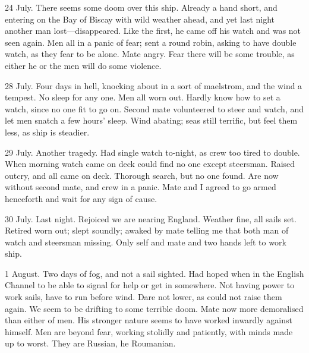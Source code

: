 \begin{diary}{24 July.}
There seems some doom over this ship. Already a hand short, and entering on the Bay of Biscay with wild weather ahead, and yet last night another man lost—disappeared. Like the first, he came off his watch and was not seen again. Men all in a panic of fear; sent a round robin, asking to have double watch, as they fear to be alone. Mate angry. Fear there will be some trouble, as either he or the men will do some violence.
\end{diary}
 
\begin{diary}{28 July.}
Four days in hell, knocking about in a sort of maelstrom, and the wind a tempest. No sleep for any one. Men all worn out. Hardly know how to set a watch, since no one fit to go on. Second mate volunteered to steer and watch, and let men snatch a few hours' sleep. Wind abating; seas still terrific, but feel them less, as ship is steadier.
\end{diary}

 \begin{diary}{29 July.}
Another tragedy. Had single watch to-night, as crew too tired to double. When morning watch came on deck could find no one except steersman. Raised outcry, and all came on deck. Thorough search, but no one found. Are now without second mate, and crew in a panic. Mate and I agreed to go armed henceforth and wait for any sign of cause.
\end{diary}
 
\begin{diary}{30 July.}
Last night. Rejoiced we are nearing England. Weather fine, all sails set. Retired worn out; slept soundly; awaked by mate telling me that both man of watch and steersman missing. Only self and mate and two hands left to work ship.
\end{diary}
 
\begin{diary}{1 August.}
Two days of fog, and not a sail sighted. Had hoped when in the English Channel to be able to signal for help or get in somewhere. Not having power to work sails, have to run before wind. Dare not lower, as could not raise them again. We seem to be drifting to some terrible doom. Mate now more demoralised than either of men. His stronger nature seems to have worked inwardly against himself. Men are beyond fear, working stolidly and patiently, with minds made up to worst. They are Russian, he Roumanian.
\end{diary}
 
